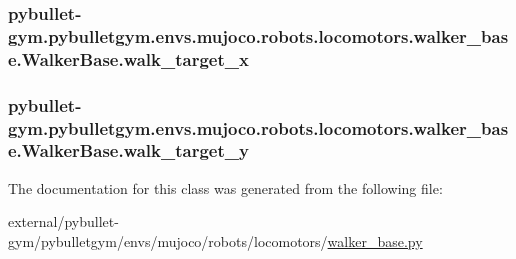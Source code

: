 \subsubsection[{\texorpdfstring{walk\+\_\+target\+\_\+x}{walk_target_x}}]{\setlength{\rightskip}{0pt plus 5cm}pybullet-\/gym.\+pybulletgym.\+envs.\+mujoco.\+robots.\+locomotors.\+walker\+\_\+base.\+Walker\+Base.\+walk\+\_\+target\+\_\+x}\hypertarget{classpybullet-gym_1_1pybulletgym_1_1envs_1_1mujoco_1_1robots_1_1locomotors_1_1walker__base_1_1_walker_base_ae080933be769cda2205a1b5c2381a37c}{}\label{classpybullet-gym_1_1pybulletgym_1_1envs_1_1mujoco_1_1robots_1_1locomotors_1_1walker__base_1_1_walker_base_ae080933be769cda2205a1b5c2381a37c}
\subsubsection[{\texorpdfstring{walk\+\_\+target\+\_\+y}{walk_target_y}}]{\setlength{\rightskip}{0pt plus 5cm}pybullet-\/gym.\+pybulletgym.\+envs.\+mujoco.\+robots.\+locomotors.\+walker\+\_\+base.\+Walker\+Base.\+walk\+\_\+target\+\_\+y}\hypertarget{classpybullet-gym_1_1pybulletgym_1_1envs_1_1mujoco_1_1robots_1_1locomotors_1_1walker__base_1_1_walker_base_ad4e203cc41add9a68ca1a955ec50af1a}{}\label{classpybullet-gym_1_1pybulletgym_1_1envs_1_1mujoco_1_1robots_1_1locomotors_1_1walker__base_1_1_walker_base_ad4e203cc41add9a68ca1a955ec50af1a}


The documentation for this class was generated from the following file\+:\begin{DoxyCompactItemize}
\item 
external/pybullet-\/gym/pybulletgym/envs/mujoco/robots/locomotors/\hyperlink{mujoco_2robots_2locomotors_2walker__base_8py}{walker\+\_\+base.\+py}\end{DoxyCompactItemize}
